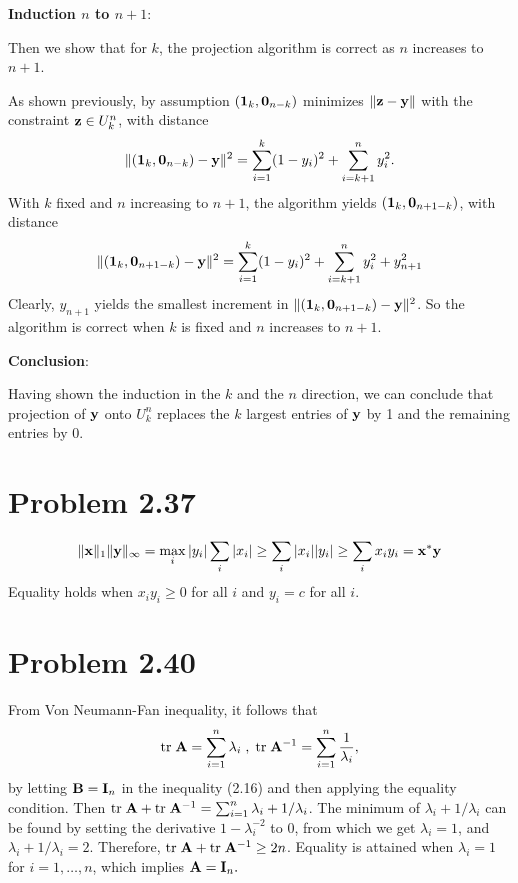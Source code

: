 \documentclass{scrartcl}
\begin{document}
\textbf{Induction $n$ to $n+1$}:

Then we show that for $k$, the projection algorithm is correct
as $n$ increases to $n+1$.

As shown previously, by assumption $(\mathbf{1}_k, \mathbf{0}_{n-k})$
minimizes $\| \mathbf{z} - \mathbf{y} \|$ with the constraint $\mathbf{z} \in U_k^n$, with distance
\begin{equation}
	\| (\mathbf{1}_k, \mathbf{0}_{n-k}) - \mathbf{y} \|^2
	= \sum_{i=1}^k (1-y_i)^2 + \sum_{i=k+1}^n y_i^2 .
\end{equation}
With $k$ fixed and $n$ increasing to $n+1$, the algorithm yields $(\mathbf{1}_{k}, \mathbf{0}_{n+1-k})$,
with distance
\begin{equation}
	\begin{split}
	\| (\mathbf{1}_{k}, \mathbf{0}_{n+1-k}) - \mathbf{y} \|^2
	& = \sum_{i=1}^{k} (1-y_i)^2 + \sum_{i=k+1}^n y_i^2 + y_{n+1}^2 \\
	\end{split}
	\label{eqn:kplus1}
\end{equation}
Clearly, $y_{n+1}$ yields the smallest increment in $\| (\mathbf{1}_{k}, \mathbf{0}_{n+1-k}) - \mathbf{y} \|^2$.
So the algorithm is correct when $k$ is fixed and $n$ increases to $n+1$.

\textbf{Conclusion}:

Having shown the induction in the $k$ and the $n$ direction, we can conclude that
projection of $\mathbf{y}$ onto $U_k^n$ replaces the $k$ largest entries of $\mathbf{y}$ by 1
and the remaining entries by 0.

\section*{Problem 2.37}

\begin{equation}
	\begin{split}
	\| \mathbf{x} \|_1 \| \mathbf{y} \|_\infty
	= \max_i |y_i| \sum_i |x_i|
	\ge \sum_i |x_i||y_i|
	\ge \sum_i x_i y_i
	= \mathbf{x}^*\mathbf{y}
	\end{split}
\end{equation}
Equality holds when $x_i y_i \ge 0$ for all $i$ and $y_i = c$ for all $i$.




\section*{Problem 2.40}

From Von Neumann-Fan inequality, it follows that
\begin{equation}
	\mathrm{tr} \; \mathbf{A} = \sum_{i=1}^n \lambda_i \; , \; 
	\mathrm{tr} \; \mathbf{A}^{-1} = \sum_{i=1}^n {1 \over \lambda_i} ,
\end{equation}
by letting $\mathbf{B} = \mathbf{I}_{n}$ in the inequality (2.16) and then applying
the equality condition.
Then $\mathrm{tr} \; \mathbf{A} + \mathrm{tr} \; \mathbf{A}^{-1} = \sum_{i=1}^n \lambda_i + 1/\lambda_i$.
The minimum of $\lambda_i + 1/\lambda_i$ can be found by setting the derivative
$1 - \lambda_i^{-2}$ to 0, from which we get $\lambda_i = 1$, and $\lambda_i + 1/\lambda_i = 2$.
Therefore, $\mathrm{tr} \; \mathbf{A} + \mathrm{tr} \; \mathbf{A}^{-1} \ge 2n$. Equality is attained when
$\lambda_i = 1$ for $i = 1,\dotsc,n$, which implies $\mathbf{A} = \mathbf{I}_n.$
\end{document}
